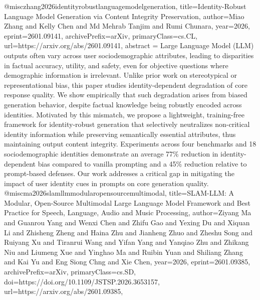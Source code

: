 {}@misc{zhang2026identityrobustlanguagemodelgeneration,
      title={Identity-Robust Language Model Generation via Content Integrity Preservation}, 
      author={Miao Zhang and Kelly Chen and Md Mehrab Tanjim and Rumi Chunara},
      year={2026},
      eprint={2601.09141},
      archivePrefix={arXiv},
      primaryClass={cs.CL},
      url={https://arxiv.org/abs/2601.09141},
      abstract = {Large Language Model (LLM) outputs often vary across user sociodemographic attributes, leading to disparities in factual accuracy, utility, and safety, even for objective questions where demographic information is irrelevant. Unlike prior work on stereotypical or representational bias, this paper studies identity-dependent degradation of core response quality. We show empirically that such degradation arises from biased generation behavior, despite factual knowledge being robustly encoded across identities. Motivated by this mismatch, we propose a lightweight, training-free framework for identity-robust generation that selectively neutralizes non-critical identity information while preserving semantically essential attributes, thus maintaining output content integrity. Experiments across four benchmarks and 18 sociodemographic identities demonstrate an average 77\% reduction in identity-dependent bias compared to vanilla prompting and a 45\% reduction relative to prompt-based defenses. Our work addresses a critical gap in mitigating the impact of user identity cues in prompts on core generation quality.}
}@misc{ma2026slamllmmodularopensourcemultimodal,
      title={SLAM-LLM: A Modular, Open-Source Multimodal Large Language Model Framework and Best Practice for Speech, Language, Audio and Music Processing}, 
      author={Ziyang Ma and Guanrou Yang and Wenxi Chen and Zhifu Gao and Yexing Du and Xiquan Li and Zhisheng Zheng and Haina Zhu and Jianheng Zhuo and Zheshu Song and Ruiyang Xu and Tiranrui Wang and Yifan Yang and Yanqiao Zhu and Zhikang Niu and Liumeng Xue and Yinghao Ma and Ruibin Yuan and Shiliang Zhang and Kai Yu and Eng Siong Chng and Xie Chen},
      year={2026},
      eprint={2601.09385},
      archivePrefix={arXiv},
      primaryClass={cs.SD},
      doi={https://doi.org/10.1109/JSTSP.2026.3653157},
      url={https://arxiv.org/abs/2601.09385},
}
